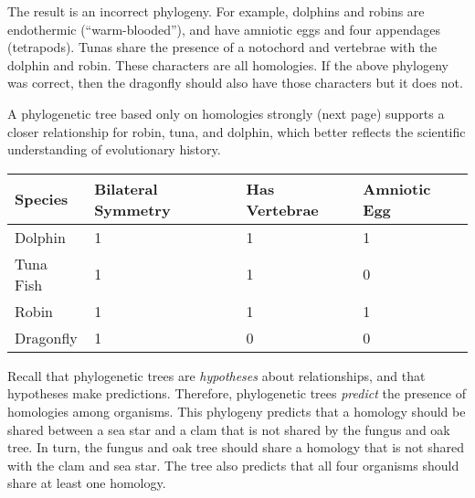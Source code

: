 \documentclass[12pt, hidelinks]{exam}
\begin{document}
\bigskip

The result is an incorrect phylogeny. For example, dolphins and robins
 are endothermic (“warm-blooded”), and have amniotic eggs and four appendages
 (tetrapods). Tunas share the presence of a notochord and vertebrae with the 
 dolphin and robin. These characters are all homologies. If the above phylogeny was
 correct, then the dragonfly should also have those characters but it does not.

A phylogenetic tree based only on homologies strongly (next page) supports a closer relationship 
for robin, tuna, and dolphin, which better reflects the scientific understanding of 
evolutionary history.

\begin{center}
	\begin{tabular}{lC{0.8in}C{0.7in}C{0.8in}}
		\toprule
		Species	& Bilateral Symmetry	&	Has Vertebrae	&	Amniotic Egg \tabularnewline
		\midrule
		Dolphin 	&	1						&	1					&	1	\tabularnewline 
		Tuna Fish	&	1						&	1					&	0	\tabularnewline
		Robin		&	1						&	1					&	1	\tabularnewline
		Dragonfly	&	1						&	0					&	0	\tabularnewline
		\bottomrule
	\end{tabular}

\bigskip


\end{center}

\bigskip

Recall that phylogenetic trees are \emph{hypotheses} about relationships,
and that hypotheses make predictions. Therefore, phylogenetic trees 
\emph{predict} the presence of homologies among organisms. This phylogeny
predicts that a homology should be shared between a sea star and a clam that
is not shared by the fungus and oak tree. In turn, the fungus and
oak tree should share a homology that is not shared with the clam and sea star. 
The tree also predicts that all four organisms should share at least one
homology.
\end{document}
